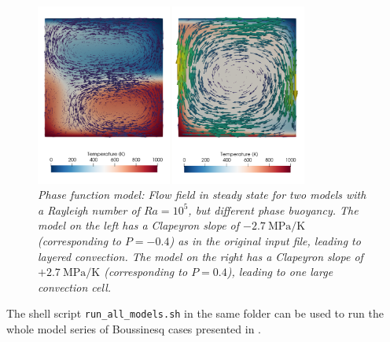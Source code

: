 \begin{figure}
\centering
\includegraphics[width=0.8\textwidth]{cookbooks/christensen_yuen_phase_function/doc/flow_field.png}
\caption{\it Phase function model: Flow field in steady state for two models with a Rayleigh number of $Ra = 10^5$, but different phase buoyancy. The model on the left has a Clapeyron slope of $-2.7~\si{\mega\pascal\per\kelvin}$ (corresponding to $P=-0.4$) as in the original input file, leading to layered convection. The model on the right has a Clapeyron slope of $+2.7~\si{\mega\pascal\per\kelvin}$ (corresponding to $P=0.4$), leading to one large convection cell.}
\label{fig:christensen_yuen}
\end{figure}

The shell script \texttt{run\_all\_models.sh} in the same folder can be used to run the whole model series of Boussinesq cases presented in \cite{CY85}.  
